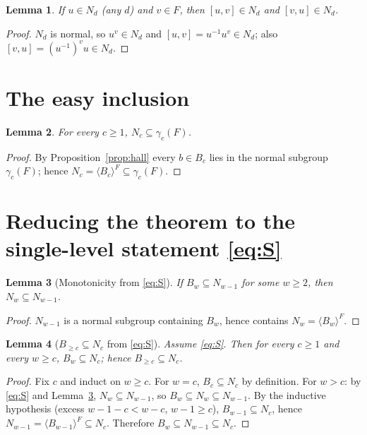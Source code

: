 \documentclass{amsart}
\newtheorem{lemma}{Lemma}
\theoremstyle{definition}
\theoremstyle{remark}
\begin{document}
\begin{lemma}\label{lem:caseA}
If $u\in N_d$ (any $d$) and $v\in F$, then $[u,v]\in N_d$ and $[v,u]\in N_d$.
\end{lemma}
\begin{proof}
$N_d$ is normal, so $u^{v}\in N_d$ and $[u,v]=u^{-1}u^{v}\in N_d$; also
$[v,u]=(u^{-1})^{v}u\in N_d$.
\end{proof}

\section{The easy inclusion}\label{sec:easy}

\begin{lemma}\label{lem:easy}
For every $c\ge1$, $N_c\subseteq\gamma_c(F)$.
\end{lemma}
\begin{proof}
By Proposition~\ref{prop:hall} every $b\in B_c$ lies in the normal subgroup
$\gamma_c(F)$; hence $N_c=\langle B_c\rangle^{F}\subseteq\gamma_c(F)$.
\end{proof}

\section{Reducing the theorem to the single-level statement \eqref{eq:S}}
\label{sec:chain}

\begin{lemma}[Monotonicity from \eqref{eq:S}]\label{lem:mono}
If $B_w\subseteq N_{w-1}$ for some $w\ge2$, then $N_w\subseteq N_{w-1}$.
\end{lemma}
\begin{proof}
$N_{w-1}$ is a normal subgroup containing $B_w$, hence contains $N_w=\langle
B_w\rangle^{F}$.
\end{proof}

\begin{lemma}[$B_{\ge c}\subseteq N_c$ from \eqref{eq:S}]\label{lem:Bgec}
Assume \eqref{eq:S}. Then for every $c\ge1$ and every $w\ge c$, $B_w\subseteq N_c$;
hence $B_{\ge c}\subseteq N_c$.
\end{lemma}
\begin{proof}
Fix $c$ and induct on $w\ge c$. For $w=c$, $B_c\subseteq N_c$ by definition. For
$w>c$: by \eqref{eq:S} and Lemma~\ref{lem:mono}, $N_w\subseteq N_{w-1}$, so
$B_w\subseteq N_w\subseteq N_{w-1}$. By the inductive hypothesis (excess
$w-1-c<w-c$, $w-1\ge c$), $B_{w-1}\subseteq N_c$, hence
$N_{w-1}=\langle B_{w-1}\rangle^{F}\subseteq N_c$. Therefore $B_w\subseteq
N_{w-1}\subseteq N_c$.
\end{proof}
\end{document}
